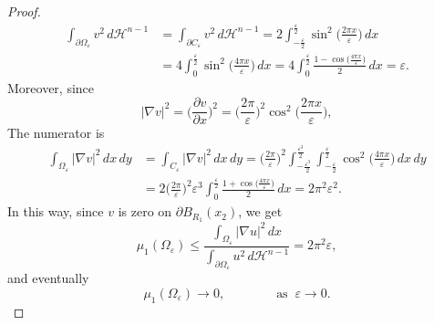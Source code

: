 \documentclass[10pt,a4paper]{amsart}
\begin{document}
\begin{proof}
\begin{equation*}
\begin{split}
\int_{\partial \Omega_\varepsilon}v^2 \,d\mathcal{H}^{n-1}&= \int_{\partial C_\varepsilon}v^2\,d\mathcal{H}^{n-1} = 2\int_{-\frac{\varepsilon}{2}}^{\frac{\varepsilon}{2}}\sin^2 \bigg(\displaystyle\frac{2\pi x}{\varepsilon}\bigg)\,dx\\
&=4\int_0^{\frac{\varepsilon}{2}} \sin^2\bigg(\displaystyle\frac{4\pi x}{\varepsilon}\bigg)\,dx
=4\displaystyle\int_0^{\frac{\varepsilon}{2}}\frac{1-\cos\bigg(\displaystyle\frac{4\pi x}{\varepsilon}\bigg)}{2}\,dx=\varepsilon.
\end{split}
\end{equation*}
Moreover, since
\begin{equation*}
	|\nabla v|^2 = \bigg(\frac{\partial v}{\partial x}\bigg)^2 = \bigg(\frac{2\pi}{\varepsilon}\bigg)^2 \cos^2\bigg(\displaystyle\frac{2\pi x}{\varepsilon}\bigg),
\end{equation*}
The numerator is
\begin{equation*}
\begin{split}
\int_{\Omega_\varepsilon}|\nabla v|^2 \,dx\,dy&= \int_{C_\varepsilon}|\nabla v|^2\,dx\,dy = \bigg(\frac{2\pi }{\varepsilon}\bigg)^2\int_{-\frac{\varepsilon^3}{2}}^{\frac{\varepsilon^3}{2}}\int_{-\frac{\varepsilon}{2}}^{\frac{\varepsilon}{2}} \cos^2\bigg(\displaystyle\frac{4\pi x}{\varepsilon}\bigg)\,dx\,dy \\
&= 2\bigg(\frac{2\pi }{\varepsilon}\bigg)^2\varepsilon^3\int_0^{\frac{\varepsilon}{2}}\frac{1+\cos\bigg(\displaystyle\frac{4\pi x}{\varepsilon}\bigg)}{2}\,dx=2\pi^2\varepsilon^2.
\end{split}
\end{equation*}
In this way, since $v$ is zero on $\partial B_{R_1}(x_2)$, we get
\begin{equation*}
	\mu_1(\Omega_\varepsilon)\le \frac{\displaystyle \int_{\Omega_\varepsilon}|\nabla u|^2\,dx}{\displaystyle \int_{\partial \Omega_\varepsilon}u^2 \,d\mathcal{H}^{n-1}}= 2\pi^2\varepsilon,
\end{equation*}
and eventually
\begin{equation*}
	\mu_1(\Omega_\varepsilon)\to 0, \qquad \qquad \text{as}\;\;\varepsilon\to 0. 
\end{equation*}
    \end{proof}
\end{document}
